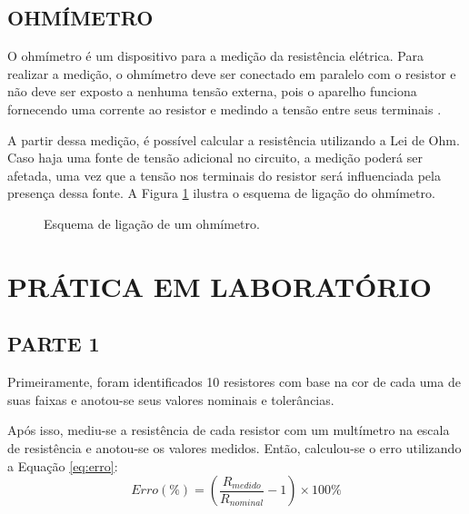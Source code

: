 \documentclass[12pt]{article}
\begin{document}
    \subsection{OHMÍMETRO}\indent

    O ohmímetro é um dispositivo para a medição da resistência elétrica. Para realizar a medição, o ohmímetro deve ser conectado em paralelo com o resistor e não deve ser exposto a nenhuma tensão externa, pois o aparelho funciona fornecendo uma corrente ao resistor e medindo a tensão entre seus terminais \parencite{ohmmeter_website}.
    
    A partir dessa medição, é possível calcular a resistência utilizando a Lei de Ohm. Caso haja uma fonte de tensão adicional no circuito, a medição poderá ser afetada, uma vez que a tensão nos terminais do resistor será influenciada pela presença dessa fonte. A Figura \ref{fig:ohmimetro} ilustra o esquema de ligação do ohmímetro.
    \begin{figure}[H]
        \centering
        \caption{Esquema de ligação de um ohmímetro.}
        \begin{minipage}{0.5\textwidth}
            \centering
            \label{fig:ohmimetro}
        \end{minipage}
    \end{figure}

\section{PRÁTICA EM LABORATÓRIO}


\subsection{PARTE 1}\indent

Primeiramente, foram identificados 10 resistores com base na cor de cada uma de suas faixas  e anotou-se seus valores nominais e tolerâncias.

Após isso, mediu-se a resistência de cada resistor com um multímetro na escala de resistência e anotou-se os valores medidos. Então, calculou-se o erro utilizando a Equação \ref{eq:erro}:
\begin{equation}
    Erro(\%) = \left(\frac{R_{medido}}{R_{nominal}} -1\right)\times 100\%
    \label{eq:erro}
\end{equation}
\end{document}
